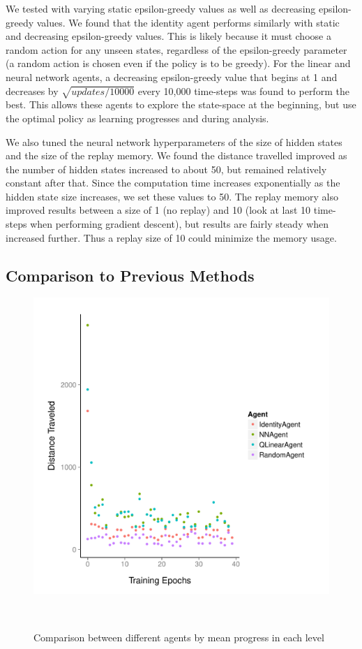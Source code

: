 \documentclass[12pt]{article}
\begin{document}
We tested with varying static epsilon-greedy values as well as decreasing epsilon-greedy values. We found that the identity agent performs similarly with static and decreasing epsilon-greedy values. This is likely because it must choose a random action for any unseen states, regardless of the epsilon-greedy parameter (a random action is chosen even if the policy is to be greedy). For the linear and neural network agents, a decreasing epsilon-greedy value that begins at 1 and decreases by $\sqrt{updates / 10000}$ every 10,000 time-steps was found to perform the best. This allows these agents to explore the state-space at the beginning, but use the optimal policy as learning progresses and during analysis.

We also tuned the neural network hyperparameters of the size of hidden states and the size of the replay memory. We found the distance travelled improved as the number of hidden states increased to about 50, but remained relatively constant after that. Since the computation time increases exponentially as the hidden state size increases, we set these values to 50. The replay memory also improved results between a size of 1 (no replay) and 10 (look at last 10 time-steps when performing gradient descent), but results are fairly steady when increased further. Thus a replay size of 10 could minimize the memory usage.

\subsection{Comparison to Previous Methods}

\begin{figure}
\includegraphics[scale=0.5]{imgs/dist_levels.pdf}
\caption{Comparison between different agents by mean progress in each level}
\label{scatter_levels}\
\end{figure}
\end{document}
